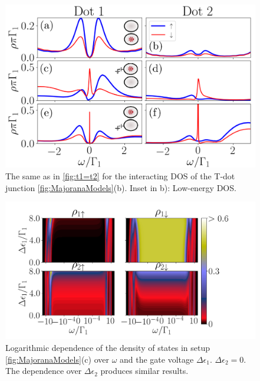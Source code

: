 \begin{figure}[bt]
\begin{center}
\includegraphics[scale=0.4]{IMAGES/NRG/t1>0.png}
\caption{  \label{fig:Nt1>0} The same as in \ref{fig:t1=t2} for the  interacting DOS of the T-dot junction \ref{fig:MajoranaModels}(b). Inset in b): Low-energy DOS. \protect\Source{}
}
%
\end{center}
\end{figure}

\begin{figure}[H]
    \centering
    \includegraphics[scale=0.4]{IMAGES/NRG/c)LogEv-ed1.png}
    \caption{\label{fig:logc}  Logarithmic dependence of the density of states in setup  \ref{fig:MajoranaModels}(c) over $\omega$ and the gate voltage $\Delta \epsilon_1$. $\Delta \epsilon_2=0$. The dependence over $\Delta \epsilon_2$ produces similar results. \protect\Source{}}
\end{figure}



